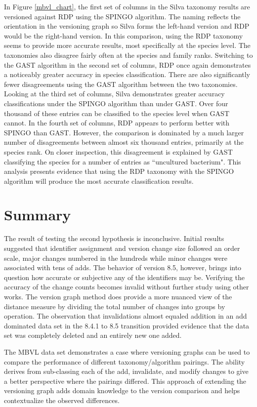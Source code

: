 In Figure \ref{mbvl_chart}, the first set of columns in the Silva taxonomy results are versioned against RDP using the SPINGO algorithm.
The naming reflects the orientation in the versioning graph so Silva forms the left-hand version and RDP would be the right-hand version.
In this comparison, using the RDP taxonomy seems to provide more accurate results, most specifically at the species level.
The taxonomies also disagree fairly often at the species and family ranks.
Switching to the GAST algorithm in the second set of columns, RDP once again demonstrates a noticeably greater accuracy in species classification.
There are also significantly fewer disagreements using the GAST algorithm between the two taxonomies.
Looking at the third set of columns, Silva demonstrates greater accuracy classifications under the SPINGO algorithm than under GAST.
Over four thousand of these entries can be classified to the species level when GAST cannot.
In the fourth set of columns, RDP appears to perform better with SPINGO than GAST.
However, the comparison is dominated by a much larger number of disagreements between almost six thousand entries, primarily at the species rank.
On closer inspection, this disagreement is explained by GAST classifying the species for a number of entries as ``uncultured bacterium".
This analysis presents evidence that using the RDP taxonomy with the SPINGO algorithm will produce the most accurate classification results.

\section{Summary}

The result of testing the second hypothesis is inconclusive.
Initial results suggested that identifier assignment and version change size followed an order scale, major changes numbered in the hundreds while minor changes were associated with tens of adds.
The behavior of version 8.5, however, brings into question how accurate or subjective any of the identifiers may be.
Verifying the accuracy of the change counts becomes invalid without further study using other works.
The version graph method does provide a more nuanced view of the distance measure by dividing the total number of changes into groups by operation.
The observation that invalidations almost equaled addition in an add dominated data set in the 8.4.1 to 8.5 transition provided evidence that the data set was completely deleted and an entirely new one added.

The MBVL data set demonstrates a case where versioning graphs can be used to compare the performance of different taxonomy/algorithm pairings.
The ability derives from sub-classing each of the add, invalidate, and modify changes to give a better perspective where the pairings differed.
This approach of extending the versioning graph adds domain knowledge to the version comparison and helps contextualize the observed differences.